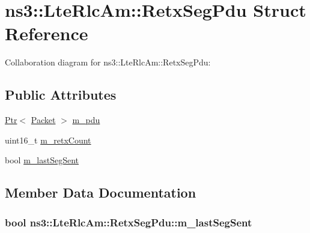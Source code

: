 \hypertarget{structns3_1_1LteRlcAm_1_1RetxSegPdu}{}\section{ns3\+:\+:Lte\+Rlc\+Am\+:\+:Retx\+Seg\+Pdu Struct Reference}
\label{structns3_1_1LteRlcAm_1_1RetxSegPdu}


Collaboration diagram for ns3\+:\+:Lte\+Rlc\+Am\+:\+:Retx\+Seg\+Pdu\+:
\subsection*{Public Attributes}
\begin{DoxyCompactItemize}
\item 
\hyperlink{classns3_1_1Ptr}{Ptr}$<$ \hyperlink{classns3_1_1Packet}{Packet} $>$ \hyperlink{structns3_1_1LteRlcAm_1_1RetxSegPdu_a5b82b2a8a14f319c522890d652721e2f}{m\+\_\+pdu}
\item 
uint16\+\_\+t \hyperlink{structns3_1_1LteRlcAm_1_1RetxSegPdu_ac417ddd810826154a26b6871e80d8498}{m\+\_\+retx\+Count}
\item 
bool \hyperlink{structns3_1_1LteRlcAm_1_1RetxSegPdu_aebedcf6018dfe872acee7e88000ac7eb}{m\+\_\+last\+Seg\+Sent}
\end{DoxyCompactItemize}


\subsection{Member Data Documentation}
\subsubsection[{\texorpdfstring{m\+\_\+last\+Seg\+Sent}{m_lastSegSent}}]{\setlength{\rightskip}{0pt plus 5cm}bool ns3\+::\+Lte\+Rlc\+Am\+::\+Retx\+Seg\+Pdu\+::m\+\_\+last\+Seg\+Sent}\hypertarget{structns3_1_1LteRlcAm_1_1RetxSegPdu_aebedcf6018dfe872acee7e88000ac7eb}{}\label{structns3_1_1LteRlcAm_1_1RetxSegPdu_aebedcf6018dfe872acee7e88000ac7eb}
